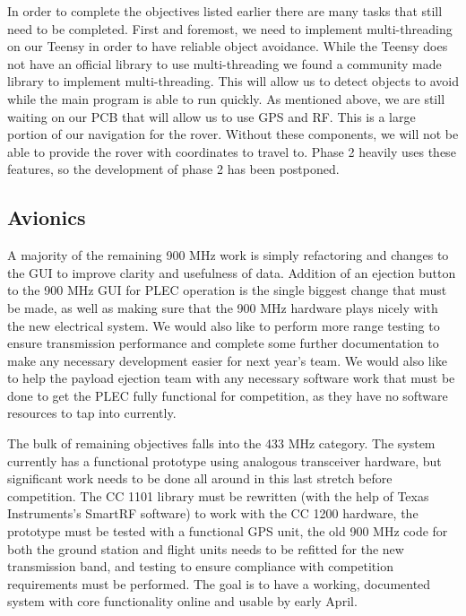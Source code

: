 \documentclass[journal,10pt,draftclsnofoot,onecolumn,compsoc]{IEEEtran} \usepackage[margin=0.75in]{geometry}
\begin{document}
In order to complete the objectives listed earlier there are many tasks that still need to be completed. First and foremost, we need to implement multi-threading on our Teensy in order to have reliable object avoidance. While the Teensy does not have an official library to use multi-threading we found a community made library to implement multi-threading. This will allow us to detect objects to avoid while the main program is able to run quickly. As mentioned above, we are still waiting on our PCB that will allow us to use GPS and RF. This is a large portion of our navigation for the rover. Without these components, we will not be able to provide the rover with coordinates to travel to. Phase 2 heavily uses these features, so the development of phase 2 has been postponed. 

\subsection{Avionics}
A majority of the remaining 900 MHz work is simply refactoring and changes to the GUI to improve clarity and usefulness of data. Addition of an ejection button to the 900 MHz GUI for PLEC operation is the single biggest change that must be made, as well as making sure that the 900 MHz hardware plays nicely with the new electrical system. We would also like to perform more range testing to ensure transmission performance and complete some further documentation to make any necessary development easier for next year's team. We would also like to help the payload ejection team with any necessary software work that must be done to get the PLEC fully functional for competition, as they have no software resources to tap into currently. \newline

\noindent The bulk of remaining objectives falls into the 433 MHz category. The system currently has a functional prototype using analogous transceiver hardware, but significant work needs to be done all around in this last stretch before competition. The CC 1101 library must be rewritten (with the help of Texas Instruments's SmartRF software) to work with the CC 1200 hardware, the prototype must be tested with a functional GPS unit, the old 900 MHz code for both the ground station and flight units needs to be refitted for the new transmission band, and testing to ensure compliance with competition requirements must be performed. The goal is to have a working, documented system with core functionality online and usable by early April. 
\end{document}
